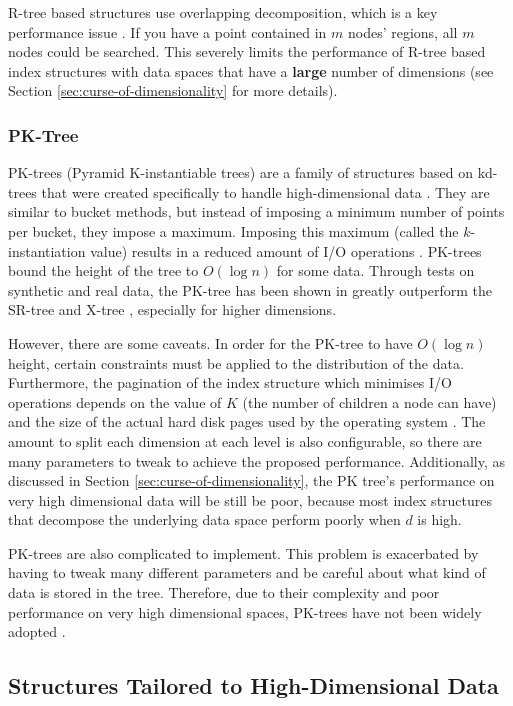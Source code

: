 R-tree based structures use overlapping decomposition, which is a key performance issue \cite{pyramid-tree}. If you have a point contained in $m$ nodes' regions, all $m$ nodes could be searched. This severely limits the performance of R-tree based index structures with data spaces that have a \textbf{large} number of dimensions (see Section \ref{sec:curse-of-dimensionality} for more details).

\subsubsection{PK-Tree}

PK-trees (Pyramid K-instantiable trees) are a family of structures based on kd-trees that were created specifically to handle high-dimensional data \cite{pk-tree}. They are similar to bucket methods, but instead of imposing a minimum number of points per bucket, they impose a maximum. Imposing this maximum (called the $k$-instantiation value) results in a reduced amount of I/O operations \cite{md-structures-samet}. PK-trees bound the height of the tree to $O(\log n)$ for some data. Through tests on synthetic and real data, the PK-tree has been shown in greatly outperform the SR-tree and X-tree \cite{pk-tree}, especially for higher dimensions.

However, there are some caveats. In order for the PK-tree to have $O(\log n)$ height, certain constraints must be applied to the distribution of the data. Furthermore, the pagination of the index structure which minimises I/O operations depends on the value of $K$ (the number of children a node can have) and the size of the actual hard disk pages used by the operating system \cite{pk-tree}. The amount to split each dimension at each level is also configurable, so there are many parameters to tweak to achieve the proposed performance. Additionally, as discussed in Section \ref{sec:curse-of-dimensionality}, the PK tree's performance on very high dimensional data will be still be poor, because most index structures that decompose the underlying data space perform poorly when $d$ is high.

PK-trees are also complicated to implement. This problem is exacerbated by having to tweak many different parameters and be careful about what kind of data is stored in the tree. Therefore, due to their complexity and poor performance on very high dimensional spaces, PK-trees have not been widely adopted \cite{md-structures-samet}.

\subsection{Structures Tailored to High-Dimensional Data}
\label{sec:high-dimensional-structures}

